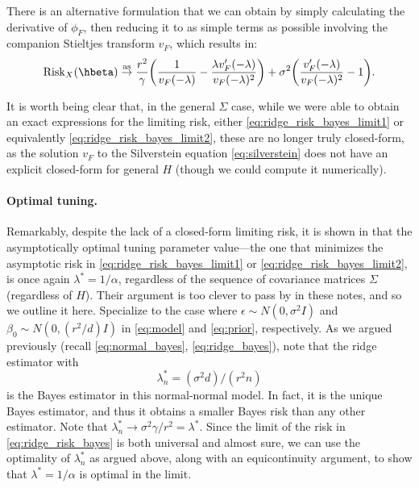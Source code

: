 \documentclass{article}
\begin{document}
There is an alternative formulation that we can obtain by simply calculating the 
derivative of $\phi_F$, then reducing it to as simple terms as possible
involving the companion Stieltjes transform $v_F$, which results in:     
\begin{equation}
\label{eq:ridge_risk_bayes_limit2}
\Risk_X(\hbeta) \asto \frac{r^2}{\gamma} \bigg( \frac{1}{v_F(-\lambda)} -
  \frac{\lambda v'_F(-\lambda)}{v_F(-\lambda)^2} \bigg) + \sigma^2 \bigg( 
  \frac{v'_F(-\lambda)}{v_F(-\lambda)^2} - 1 \bigg).
\end{equation}

It is worth being clear that, in the general $\Sigma$ case, while we were able
to obtain an exact expressions for the limiting risk, either
\eqref{eq:ridge_risk_bayes_limit1} or equivalently
\eqref{eq:ridge_risk_bayes_limit2}, these are no longer truly closed-form, as
the solution $v_F$ to the Silverstein equation \eqref{eq:silverstein} does not
have an explicit closed-form for general $H$ (though we could compute it
numerically).  

\paragraph{Optimal tuning.}

Remarkably, despite the lack of a closed-form limiting risk, it is shown in
\citet{dobriban2018high} that the asymptotically optimal tuning parameter
value---the one that minimizes the asymptotic risk in
\eqref{eq:ridge_risk_bayes_limit1} or \eqref{eq:ridge_risk_bayes_limit2}, is
once again $\lambda^* = 1/\alpha$, regardless of the sequence of covariance
matrices $\Sigma$ (regardless of $H$). Their argument is too clever to pass by
in these notes, and so we outline it here. Specialize to the case where
$\epsilon \sim N(0,\sigma^2 I)$ and $\beta_0 \sim N(0, (r^2/d) I)$ in
\eqref{eq:model} and \eqref{eq:prior}, respectively. As we argued previously
(recall \eqref{eq:normal_bayes}, \eqref{eq:ridge_bayes}), note that the ridge
estimator with
\[
\lambda^*_n = (\sigma^2 d)/(r^2 n)
\]
is the Bayes estimator in this normal-normal model. In fact, it is the unique
Bayes estimator, and thus it obtains a smaller Bayes risk than any other
estimator. Note that $\lambda^*_n \to \sigma^2 \gamma / r^2= \lambda^*$. Since 
the limit of the risk in \eqref{eq:ridge_risk_bayes} is both universal and
almost sure, we can use the optimality of $\lambda^*_n$ as argued above, along
with an equicontinuity argument, to show that $\lambda^* = 1/\alpha$ is optimal
in the limit.  
\end{document}
